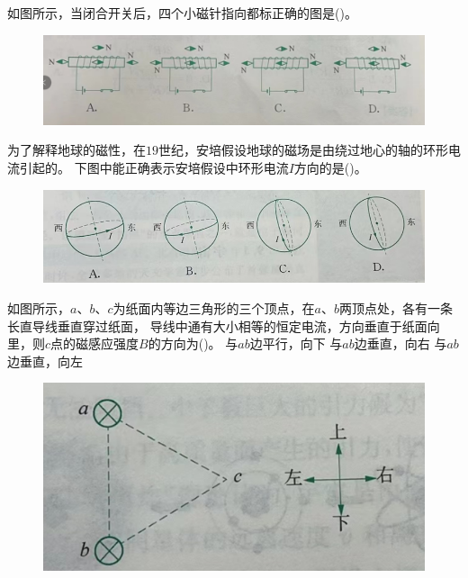 \documentclass[a4paper,cs4size]{BHCexam}
\begin{document}
\begin{groups}
\begin{questions}[]
        \question[5]如图所示，当闭合开关后，四个小磁针指向都标正确的图是(\quad\quad\quad)。
        \begin{figure}[htb]
            \center
            \includegraphics [scale=0.6,trim=0 0 0 0]{./image/physics_circuit5_8.png}
            \label{fig:fig_circuit5_8}
        \end{figure}
        \vspace{2.5cm}


        \question[5] 为了解释地球的磁性，在$19$世纪，安培假设地球的磁场是由绕过地心的轴的环形电流引起的。
        下图中能正确表示安培假设中环形电流$I$方向的是(\quad\quad\quad)。
        \begin{figure}[htb]
            \center
            \includegraphics [scale=0.85,trim=0 0 0 0]{./image/physics_circuit5_6.png}
            \label{fig:fig_circuit5_6}
        \end{figure}
        \vspace{2.5cm}

        \question[5] 如图所示，$a$、$b$、$c$为纸面内等边三角形的三个顶点，在$a$、$b$两顶点处，各有一条长直导线垂直穿过纸面，
        导线中通有大小相等的恒定电流，方向垂直于纸面向里，则$c$点的磁感应强度$B$的方向为(\quad\quad\quad)。
        {与$ab$边平行，向下}
        {与$ab$边垂直，向右}
        {与$ab$边垂直，向左}
        \begin{figure}[htb]
            \flushright
            \includegraphics [scale=0.5,trim=0 0 0 0]{./image/physics_circuit5_7.png}
            \label{fig:fig_circuit5_7}
        \end{figure}



\end{questions}
\end{groups}
\end{document}
